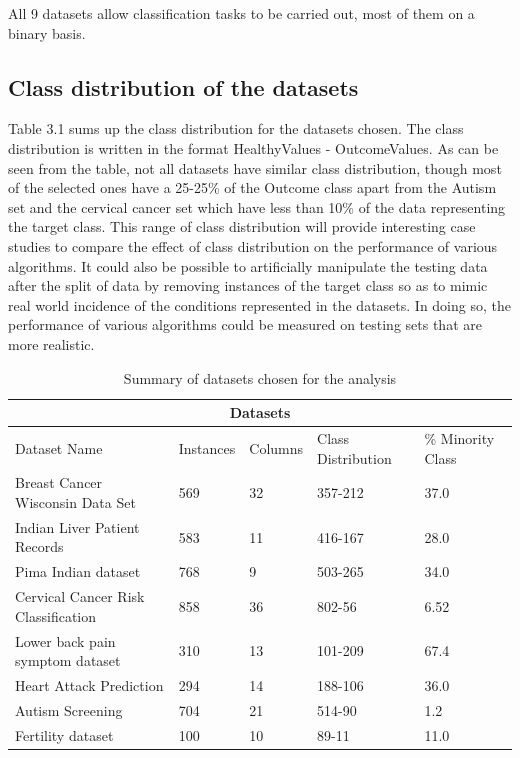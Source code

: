 All 9 datasets allow classification tasks to be carried out, most of them on a binary basis.

\subsection{Class distribution of the datasets}
Table 3.1 sums up the class distribution for the datasets chosen. The class distribution is written in the format HealthyValues - OutcomeValues.
As can be seen from the table, not all datasets have similar class distribution, though most of the selected ones have a 25-25\% of the Outcome class apart from the Autism set and the cervical cancer set which have less than 10\% of the data representing the target class. \newline This range of class distribution will provide interesting case studies to compare the effect of class distribution on the performance of various algorithms. It could also be possible to artificially manipulate the testing data after the split of data by removing instances of the target class so as to mimic real world incidence of the conditions represented in the datasets. In doing so, the performance of various algorithms could be measured on testing sets that are more realistic.

\begin{table}
\begin{tabular}{ p{4.5cm}p{1.5cm} p{1.5cm}  p{2 cm} p{1.5cm}}
 \hline
 \multicolumn{5}{c}{Datasets} \\
 \hline
 \hline
 \rowcolor{LightCyan}
 Dataset Name & Instances & Columns & Class Distribution & \% Minority Class \\
 \hline
 Breast Cancer Wisconsin Data Set& 569 & 32 & 
357-212 & 37.0\\
Indian Liver Patient Records&  583 & 11  & 416-167 & 28.0 \\
Pima Indian dataset& 768 & 9  & 503-265 & 34.0 \\
Cervical Cancer Risk Classification & 858 &  36 & 802-56 & 6.52\\
Lower back pain symptom dataset & 310 & 13  & 101-209 & 67.4\\
Heart Attack Prediction & 294 & 14  & 188-106 & 36.0\\
Autism Screening&704 & 21 &514-90 & 1.2 \\
Fertility dataset&100  & 10 & 89-11 & 11.0\\
\hline
\end{tabular}
\caption{Summary of datasets chosen for the analysis}
\label{tab:1}
\end{table}


